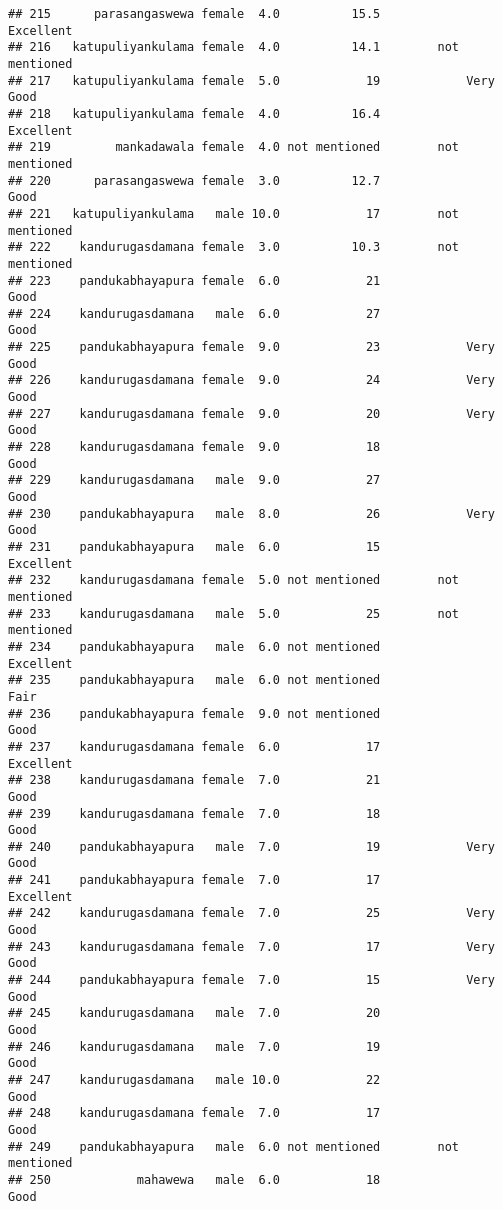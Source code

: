\documentclass[
]{article}
\begin{document}
\begin{verbatim}
## 215      parasangaswewa female  4.0          15.5            Excellent
## 216   katupuliyankulama female  4.0          14.1        not mentioned
## 217   katupuliyankulama female  5.0            19            Very Good
## 218   katupuliyankulama female  4.0          16.4            Excellent
## 219         mankadawala female  4.0 not mentioned        not mentioned
## 220      parasangaswewa female  3.0          12.7                 Good
## 221   katupuliyankulama   male 10.0            17        not mentioned
## 222    kandurugasdamana female  3.0          10.3        not mentioned
## 223    pandukabhayapura female  6.0            21                 Good
## 224    kandurugasdamana   male  6.0            27                 Good
## 225    pandukabhayapura female  9.0            23            Very Good
## 226    kandurugasdamana female  9.0            24            Very Good
## 227    kandurugasdamana female  9.0            20            Very Good
## 228    kandurugasdamana female  9.0            18                 Good
## 229    kandurugasdamana   male  9.0            27                 Good
## 230    pandukabhayapura   male  8.0            26            Very Good
## 231    pandukabhayapura   male  6.0            15            Excellent
## 232    kandurugasdamana female  5.0 not mentioned        not mentioned
## 233    kandurugasdamana   male  5.0            25        not mentioned
## 234    pandukabhayapura   male  6.0 not mentioned            Excellent
## 235    pandukabhayapura   male  6.0 not mentioned                 Fair
## 236    pandukabhayapura female  9.0 not mentioned                 Good
## 237    kandurugasdamana female  6.0            17            Excellent
## 238    kandurugasdamana female  7.0            21                 Good
## 239    kandurugasdamana female  7.0            18                 Good
## 240    pandukabhayapura   male  7.0            19            Very Good
## 241    pandukabhayapura female  7.0            17            Excellent
## 242    kandurugasdamana female  7.0            25            Very Good
## 243    kandurugasdamana female  7.0            17            Very Good
## 244    pandukabhayapura female  7.0            15            Very Good
## 245    kandurugasdamana   male  7.0            20                 Good
## 246    kandurugasdamana   male  7.0            19                 Good
## 247    kandurugasdamana   male 10.0            22                 Good
## 248    kandurugasdamana female  7.0            17                 Good
## 249    pandukabhayapura   male  6.0 not mentioned        not mentioned
## 250            mahawewa   male  6.0            18                 Good

\end{verbatim}
\end{document}
